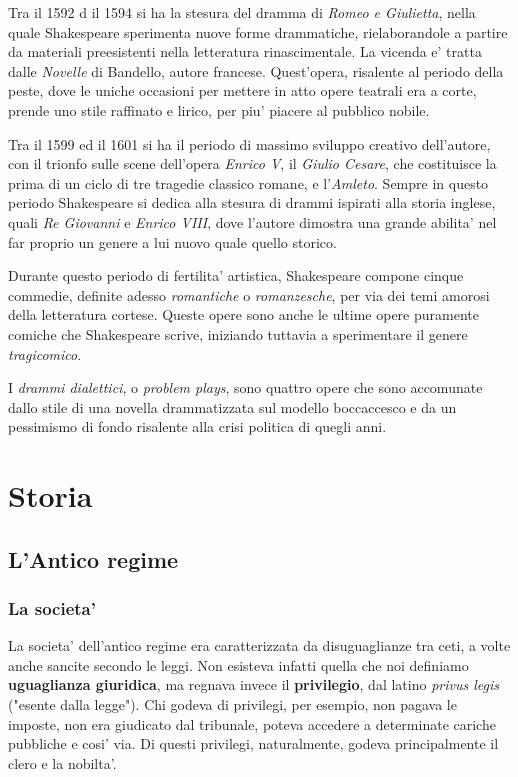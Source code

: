\documentclass{article}
\begin{document}
{{    Tra il 1592 d il 1594 si ha la stesura del dramma di \textit{Romeo e Giulietta}, nella quale Shakespeare sperimenta nuove forme drammatiche, rielaborandole a partire da materiali preesistenti nella letteratura rinascimentale. La vicenda e' tratta dalle \textit{Novelle} di Bandello, autore francese. Quest'opera, risalente al periodo della peste, dove le uniche occasioni per mettere in atto opere teatrali era a corte, prende uno stile raffinato e lirico, per piu' piacere al pubblico nobile.

    Tra il 1599 ed il 1601 si ha il periodo di massimo sviluppo creativo dell'autore, con il trionfo sulle scene dell'opera \textit{Enrico V}, il \textit{Giulio Cesare}, che costituisce la prima di un ciclo di tre tragedie classico romane, e l'\textit{Amleto}. Sempre in questo periodo Shakespeare si dedica alla stesura di drammi ispirati alla storia inglese, quali \textit{Re Giovanni} e \textit{Enrico VIII}, dove l'autore dimostra una grande abilita' nel far proprio un genere a lui nuovo quale quello storico.

    Durante questo periodo di fertilita' artistica, Shakespeare compone cinque commedie, definite adesso \textit{romantiche} o \textit{romanzesche}, per via dei temi amorosi della letteratura cortese. Queste opere sono anche le ultime opere puramente comiche che Shakespeare scrive, iniziando tuttavia a sperimentare il genere \textit{tragicomico}.

    I \textit{drammi dialettici}, o \textit{problem plays}, sono quattro opere che sono accomunate dallo stile di una novella drammatizzata sul modello boccaccesco e da un pessimismo di fondo risalente alla crisi politica di quegli anni.
  }

  \section{Storia}
  {
    \subsection{L'Antico regime}
    \subsubsection{La societa'}
    La societa' dell'antico regime era caratterizzata da disuguaglianze tra ceti, a volte anche sancite secondo le leggi. Non esisteva infatti quella che noi definiamo \textbf{uguaglianza giuridica}, ma regnava invece il \textbf{privilegio}, dal latino \textit{privus legis} \small{("esente dalla legge")}. Chi godeva di privilegi, per esempio, non pagava le imposte, non era giudicato dal tribunale, poteva accedere a determinate cariche pubbliche e cosi' via. Di questi privilegi, naturalmente, godeva principalmente il clero e la nobilta'.

}}
\end{document}
